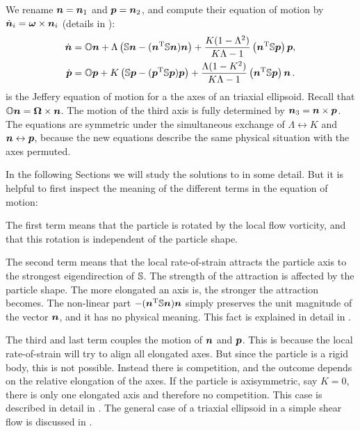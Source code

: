 \documentclass[thesis.tex]{subfiles}
\begin{document}
We rename $\mbox{\boldmath$n$} = \mbox{\boldmath$n$}_1$ and $\mbox{\boldmath$p$}=\mbox{\boldmath$n$}_2$, and compute their equation of motion by $\dot{\mbox{\boldmath$n$}}_i=\mbox{\boldmath$\omega$} \times \mbox{\boldmath$n$}_i$ (details in ):
\begin{align}
	\dot{\ve n}	&= \ma O \ve n 
	+ \Lambda\left(
	\ma S \ve n - (\ve n \transpose \ma S \ve n) \ve n
	\right)
    + \frac{K(1- \Lambda^2)}{K \Lambda - 1}\left(\ve n\transpose \ma S\ve p\right)\ve p,  \nn\\
\dot{\ve p}	&=    \ma O \ve p
	 + K\left(
\ma S \ve p  - (\ve p \transpose \ma S \ve p) \ve p
	 \right)
	  + \frac{\Lambda(1-K^2)}{K \Lambda - 1}\left(\ve n\transpose \ma S\ve p\right)\ve n\,. \eqnlab{np}
\end{align}
 is the Jeffery equation of motion for a the axes of an triaxial ellipsoid. Recall that $\mathbb{O} \mbox{\boldmath$n$}=\mbox{\boldmath$\Omega$} \times \mbox{\boldmath$n$}$. The motion of the third axis is fully determined by $\mbox{\boldmath$n$}_3 = \mbox{\boldmath$n$} \times \mbox{\boldmath$p$}$. The equations are symmetric under the simultaneous exchange of $\Lambda\leftrightarrow K$ and $\mbox{\boldmath$n$}\leftrightarrow\mbox{\boldmath$p$}$, because the new equations describe the same physical situation with the axes permuted.

In the following Sections we will study the solutions to  in some detail. But it is helpful to first inspect the meaning of the different terms in the equation of motion:

The first term means that the particle is rotated by the local flow vorticity, and that this rotation is independent of the particle shape.

The second term means that the local rate-of-strain attracts the particle axis to the strongest eigendirection of $\mathbb{S}$. The strength of the attraction is affected by the particle shape. The more elongated an axis is, the stronger the attraction becomes. The non-linear part $- (\mbox{\boldmath$n$} ^{\mathrm T} \mathbb{S} \mbox{\boldmath$n$}) \mbox{\boldmath$n$}$ simply preserves the unit magnitude of the vector $\mbox{\boldmath$n$}$, and it has no physical meaning. This fact is explained in detail in . 

The third and last term couples the motion of $\mbox{\boldmath$n$}$ and $\mbox{\boldmath$p$}$. This is because the local rate-of-strain will try to align all elongated axes. But since the particle is a rigid body, this is not possible. Instead there is competition, and the outcome depends on the relative elongation of the axes. If the particle is axisymmetric, say $K=0$, there is only one elongated axis and therefore no competition. This case is described in detail in . The general case of a triaxial ellipsoid in a simple shear flow is discussed in .
\end{document}
